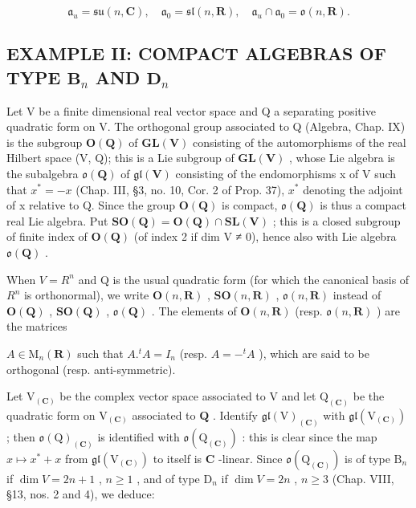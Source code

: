 \[
\mathfrak {a} _ {u} = \mathfrak {s u} (n, \mathbf {C}), \quad \mathfrak {a} _ {0} = \mathfrak {s l} (n, \mathbf {R}), \quad \mathfrak {a} _ {u} \cap \mathfrak {a} _ {0} = \mathfrak {o} (n, \mathbf {R}).
\]

\subsection{\texorpdfstring{EXAMPLE II: COMPACT ALGEBRAS OF TYPE \(\mathbf{B}_n\) AND \(\mathbf{D}_n\)}{EXAMPLE II: COMPACT ALGEBRAS OF TYPE \textbackslash mathbf\{B\}\_n AND \textbackslash mathbf\{D\}\_n}}

Let V be a finite dimensional real vector space and Q a separating positive quadratic form on V. The orthogonal group associated to Q (Algebra, Chap. IX) is the subgroup \(\mathbf{O}(\mathbf{Q})\) of \(\mathbf{GL}(\mathbf{V})\) consisting of the automorphisms of the real Hilbert space (V, Q); this is a Lie subgroup of \(\mathbf{GL}(\mathbf{V})\) , whose Lie algebra is the subalgebra \(\mathfrak{o}(\mathbf{Q})\) of \(\mathfrak{gl}(\mathbf{V})\) consisting of the endomorphisms x of V such that \(x^{*} = -x\) (Chap. III, §3, no. 10, Cor. 2 of Prop. 37), \(x^{*}\) denoting the adjoint of x relative to Q. Since the group \(\mathbf{O}(\mathbf{Q})\) is compact, \(\mathfrak{o}(\mathbf{Q})\) is thus a compact real Lie algebra. Put \(\mathbf{SO}(\mathbf{Q}) = \mathbf{O}(\mathbf{Q}) \cap \mathbf{SL}(\mathbf{V})\) ; this is a closed subgroup of finite index of \(\mathbf{O}(\mathbf{Q})\) (of index 2 if dim V ≠ 0), hence also with Lie algebra \(\mathfrak{o}(\mathbf{Q})\) .

When \(V = R^{n}\) and Q is the usual quadratic form (for which the canonical basis of \(R^{n}\) is orthonormal), we write \(\mathbf{O}(n, \mathbf{R})\) , \(\mathbf{SO}(n, \mathbf{R})\) , \(\mathfrak{o}(n, \mathbf{R})\) instead of \(\mathbf{O}(\mathbf{Q})\) , \(\mathbf{SO}(\mathbf{Q})\) , \(\mathfrak{o}(\mathbf{Q})\) . The elements of \(\mathbf{O}(n, \mathbf{R})\) (resp. \(\mathfrak{o}(n, \mathbf{R})\) ) are the matrices

\(A \in \mathrm{M}_n(\mathbf{R})\) such that \(A.^t A = I_n\) (resp. \(A = -^t A\) ), which are said to be orthogonal (resp. anti-symmetric).

Let \(\mathrm{V}_{(\mathbf{C})}\) be the complex vector space associated to \(\mathrm{V}\) and let \(\mathrm{Q}_{(\mathbf{C})}\) be the quadratic form on \(\mathrm{V}_{(\mathbf{C})}\) associated to \(\mathbf{Q}\) . Identify \(\mathfrak{gl}(\mathrm{V})_{(\mathbf{C})}\) with \(\mathfrak{gl}(\mathrm{V}_{(\mathbf{C})})\) ; then \(\mathfrak{o}(\mathrm{Q})_{(\mathbf{C})}\) is identified with \(\mathfrak{o}(\mathrm{Q}_{(\mathbf{C})})\) : this is clear since the map \(x \mapsto x^{*} + x\) from \(\mathfrak{gl}(\mathrm{V}_{(\mathbf{C})})\) to itself is \(\mathbf{C}\) -linear. Since \(\mathfrak{o}(\mathrm{Q}_{(\mathbf{C})})\) is of type \(\mathrm{B}_n\) if \(\dim V = 2n + 1\) , \(n \geq 1\) , and of type \(\mathrm{D}_n\) if \(\dim V = 2n\) , \(n \geq 3\) (Chap. VIII, §13, nos. 2 and 4), we deduce:

